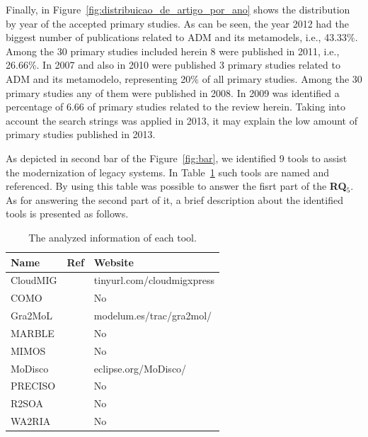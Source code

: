 %

Finally, in Figure~\ref{fig:distribuicao_de_artigo_por_ano} shows the distribution by year of the accepted primary studies. As can be seen, the year 2012 had the biggest number of publications related to ADM and its metamodels, i.e., 43.33\%. Among the 30 primary studies included herein 8 were published in 2011, i.e., 26.66\%. In 2007 and also in 2010 were published 3 primary studies related to ADM and its metamodelo, representing 20\% of all primary studies. Among the 30 primary studies any of them were published in 2008. In 2009 was identified a percentage of 6.66 of primary studies related to the review herein. Taking into account the search strings was applied in 2013, it may explain the low amount of primary studies published in 2013. 



As depicted in second bar of the Figure~\ref{fig:bar}, we identified 9 tools to assist the modernization of legacy systems. In Table~\ref{tab:tools} such tools are named and referenced. By using this table was possible to  answer the fisrt part of the \textbf{RQ$_5$}. As for answering the second part of it, a brief description about the identified tools is presented as follows. 



\begin{table}
\scriptsize
\centering
\caption{The analyzed information of each tool.}
  \begin{tabular}{|l|l|l|}
\hline 
\cellcolor{gray}Name & \cellcolor{gray}Ref & \cellcolor{gray}Website\tabularnewline
\hline 
\hline 
CloudMIG &\cite{SMR:SMR582}  & tinyurl.com/cloudmigxpress\tabularnewline
\hline 
COMO &\cite{5773392}  & No\tabularnewline
\hline 
Gra2MoL &\cite{5440163}  & modelum.es/trac/gra2mol/\tabularnewline
\hline 
MARBLE &\cite{Perez-Castillo:2011:ECS:1982185.1982249,6080834, 6498507,Perez-Castillo:2010:IBP:1875847.1875861,5871783}  & No\tabularnewline
\hline 
MIMOS &~\cite{6498507} & No\tabularnewline
\hline 
MoDisco &~\cite{Bruneliere:2010:MGE:1858996.1859032} & eclipse.org/MoDisco/\tabularnewline
\hline 
PRECISO &~\cite{delCastillo:2009:PRP:1529282.1529753}  & No\tabularnewline
\hline 
R2SOA &~\cite{Guzman:2007:AAR:1339262.1339532} & No\tabularnewline
\hline 
WA2RIA &~\cite{Rodriguez-Echeverria:2011:MLW:2186508.2186536}  & No\tabularnewline
\hline 
\end{tabular}
\label{tab:tools}
\end{table}



